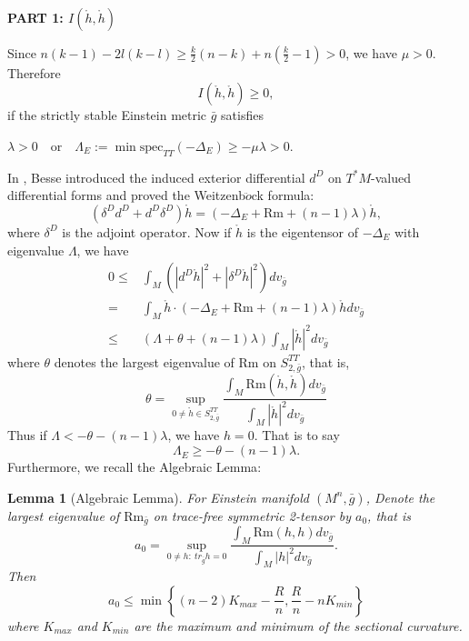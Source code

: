 \documentclass[12pt]{amsart}
\newtheorem{lemma}{Lemma}[section]
\newcommand{\bg}{\bar{g}}
\numberwithin{equation}{section}
\begin{document}
~\\
\textbf{PART 1: $I(\mathring{h},\mathring{h})$}

Since $n(k-1)-2l(k-l) \geq \frac{k}{2}(n-k) + n(\frac{k}{2}-1)>0$, we have $\mu>0$. Therefore
\begin{equation*}
    I(\mathring{h},\mathring{h}) \geq 0,
\end{equation*}
if the strictly stable Einstein metric $\bg$ satisfies 
\begin{center}
    $\lambda>0$\ \ or\ \ $\Lambda_E:= \min \mathrm{spec}_{TT}(-\Delta_E) \geq -\mu\lambda>0$.
\end{center}

In \cite{Besse2008}, Besse introduced the induced exterior differential $d^D$ on $T^*M$-valued differential forms and proved the Weitzenb$\ddot{o}$ck formula:
\begin{equation*}
    \left( \delta^D d^D + d^D \delta^D \right) \mathring{h} = \left( -\Delta_E + \mathrm{Rm} + (n-1)\lambda \right)\mathring{h},
\end{equation*}
where $\delta^D$ is the adjoint operator. Now if $\mathring{h}$ is the eigentensor of $-\Delta_E$ with eigenvalue $\Lambda$, we have
\begin{equation*}
\begin{split}
    0\leq & \int_M\left(| d^D\mathring{h} |^2 + | \delta^D\mathring{h} |^2\right)dv_{\bg}\\
    =& \int_M\mathring{h}\cdot\left(-\Delta_E+\mathrm{Rm}+(n-1) \lambda \right) \mathring{h}dv_{\bg}\\
    \leq&(\Lambda+\theta+(n-1)\lambda)\int_M|\mathring{h}|^2dv_{\bg}
\end{split}
\end{equation*}
where $\theta$ denotes the largest eigenvalue of $\mathrm{Rm}$ on $S_{2,\bg}^{TT}$, that is,
\begin{equation*}
    \theta=\sup_{0\neq \mathring{h}\in S_{2,\bg}^{TT}}\frac{\int_M\mathrm{Rm}(\mathring{h},\mathring{h})dv_{\bg}}{\int_M|\mathring{h}|^2dv_{\bg}}
\end{equation*}
Thus if $\Lambda<-\theta-(n-1)\lambda$, we have $h=0$. That is to say\begin{equation*}
    \Lambda_E\geq-\theta-(n-1)\lambda.
\end{equation*} 
Furthermore, we recall the Algebraic Lemma\cite{Fujitani1979COMPACTSP}:
\begin{lemma}[Algebraic Lemma]
    For Einstein manifold $(M^n,\bg)$, Denote the largest eigenvalue of $\mathrm{Rm}_{\bg}$ on trace-free symmetric 2-tensor by $a_0$, that is 
    \begin{equation*}
       a_0=\sup_{0\neq h:\ tr_{\bg}h=0}\frac{\int_M\mathrm{Rm}(h,h)dv_{\bg}}{\int_M|h|^2dv_{\bg}}.
    \end{equation*}
    Then
    \begin{equation*}
        a_0\leq\min\left\{(n-2)K_{max}-\frac{R}{n},\frac{R}{n}-nK_{min}\right\}
    \end{equation*}
    where $K_{max}$ and $K_{min}$ are the maximum and minimum of the sectional curvature.
\end{lemma}
\end{document}

